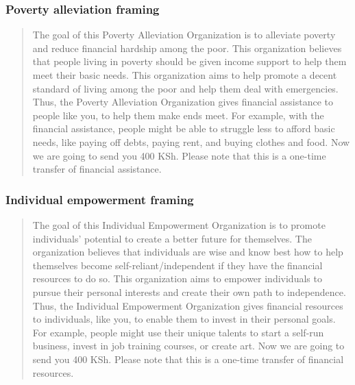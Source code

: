 \documentclass[11pt, a4paper]{article}\usepackage[]{graphicx}\usepackage[]{color}
\begin{document}
        \subsubsection{Poverty alleviation framing}

            \begin{quote}

                The goal of this Poverty Alleviation Organization is to alleviate poverty and reduce financial hardship among the poor. This organization believes that people living in poverty should be given income support to help them meet their basic needs. This organization aims to help promote a decent standard of living among the poor and help them deal with emergencies. Thus, the Poverty Alleviation Organization gives financial assistance to people like you, to help them make ends meet. For example, with the financial assistance, people might be able to struggle less to afford basic needs, like paying off debts, paying rent, and buying clothes and food. Now we are going to send you 400 KSh. Please note that this is a one-time transfer of financial assistance.

            \end{quote}

        \subsubsection{Individual empowerment framing}

            \begin{quote}

                The goal of this Individual Empowerment Organization is to promote individuals' potential to create a better future for themselves.  The organization believes that individuals are wise and know best how to help themselves become self-reliant/independent if they have the financial resources to do so. This organization aims to empower individuals to pursue their personal interests and create their own path to independence. Thus, the Individual Empowerment Organization gives financial resources to individuals, like you, to enable them to invest in their personal goals. For example, people might use their unique talents to start a self-run business, invest in job training courses, or create art. Now we are going to send you 400 KSh. Please note that this is a one-time transfer of financial resources.

            \end{quote}
\end{document}
